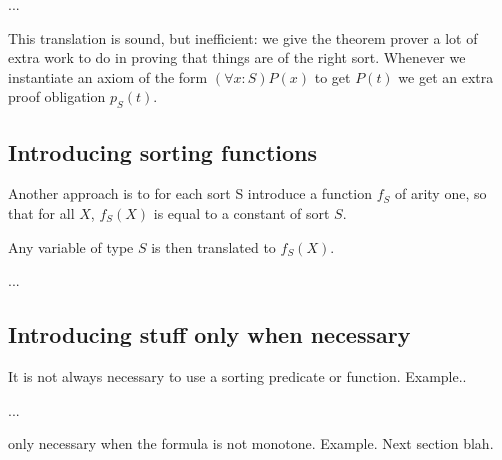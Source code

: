 ...

This translation is sound, but inefficient: we give the theorem prover
a lot of extra work to do in proving that things are of the right
sort. Whenever we instantiate an axiom of the form $(\forall
x:S)P(x)$ to get $P(t)$ we get an extra proof obligation $p_S(t)$.

\subsection{Introducing sorting functions}

Another approach is to for each sort S introduce a function $f_S$ of
arity one, so that for all $X$, $f_S(X)$ is equal to a constant of sort $S$. 

Any variable of type $S$ is then translated to $f_S(X)$.

...

\subsection{Introducing stuff only when necessary}

It is not always necessary to use a sorting predicate or function.
Example..

...

only necessary when the formula is not monotone. Example.
Next section blah.




